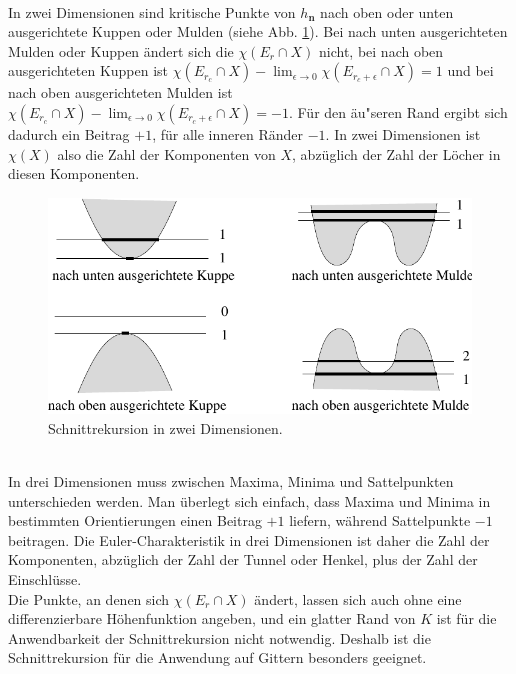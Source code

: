 \\In zwei Dimensionen sind kritische Punkte von $h_{\mathbf{n}}$ nach oben oder unten ausgerichtete Kuppen oder Mulden (siehe Abb. \ref{fig:2dschnitt}). Bei nach unten ausgerichteten Mulden oder Kuppen \"andert sich die $\chi(E_{r}\cap X)$ nicht, bei nach oben ausgerichteten Kuppen ist $\chi(E_{r_c}\cap X)-\lim_{\epsilon \rightarrow 0}\chi(E_{r_c+\epsilon}\cap X)=1$ und bei nach oben ausgerichteten Mulden ist $\chi(E_{r_c}\cap X)-\lim_{\epsilon \rightarrow 0}\chi(E_{r_c+\epsilon}\cap X)=-1$. F\"ur den \"au"seren Rand ergibt sich dadurch ein Beitrag $+1$, f\"ur alle inneren R\"ander $-1$. 
In zwei Dimensionen ist $\chi(X)$ also die Zahl der Komponenten von $X$, abz\"uglich der Zahl der L\"ocher in diesen Komponenten.
\begin{figure}[htbp]
  \centering
  \includegraphics{./Euler-figs/2dschnitt}
  \caption{Schnittrekursion in zwei Dimensionen.}
  \label{fig:2dschnitt}
\end{figure}
\\In drei Dimensionen muss zwischen Maxima, Minima und Sattelpunkten unterschieden werden. Man \"uberlegt sich einfach, dass Maxima und Minima in bestimmten Orientierungen einen Beitrag $+1$ liefern, w\"ahrend Sattelpunkte $-1$ beitragen. Die Euler-Charakteristik in drei Dimensionen ist daher die Zahl der Komponenten, abz\"uglich der Zahl der Tunnel oder Henkel, plus der Zahl der Einschl\"usse.\\
Die Punkte, an denen sich $\chi(E_{r}\cap X)$ \"andert, lassen sich auch ohne eine differenzierbare H\"ohenfunktion angeben, und ein glatter Rand von $K$ ist f\"ur die Anwendbarkeit der Schnittrekursion nicht notwendig. Deshalb ist die Schnittrekursion f\"ur die Anwendung auf Gittern besonders geeignet.

